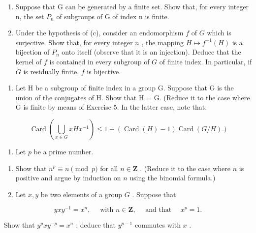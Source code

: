 \begin{enumerate}
\def\labelenumi{(\alph{enumi})}
\setcounter{enumi}{2}
\item
  Suppose that G can be generated by a finite set. Show that, for every integer n, the set \(P_{n}\) of subgroups of G of index n is finite.
\item
  Under the hypothesis of (c), consider an endomorphism \(f\) of \(G\) which is surjective. Show that, for every integer \(n\) , the mapping \(H \mapsto f^{-1}(H)\) is a bijection of \(P_n\) onto itself (observe that it is an injection). Deduce that the kernel of \(f\) is contained in every subgroup of \(G\) of finite index. In particular, if \(G\) is residually finite, \(f\) is bijective.
\end{enumerate}

\begin{enumerate}
\def\labelenumi{\arabic{enumi}.}
\setcounter{enumi}{5}
\tightlist
\item
  Let H be a subgroup of finite index in a group G. Suppose that G is the union of the conjugates of H. Show that H = G. (Reduce it to the case where G is finite by means of Exercise 5. In the latter case, note that:
\end{enumerate}

\[
\operatorname{Card} \left(\bigcup_ {x \in G} x H x ^ {- 1}\right) \leqslant 1 + (\operatorname{Card} (H) - 1) \operatorname{Card} (G / H).)
\]

\begin{enumerate}
\def\labelenumi{\arabic{enumi}.}
\setcounter{enumi}{6}
\tightlist
\item
  Let \(p\) be a prime number.
\end{enumerate}

\begin{enumerate}
\def\labelenumi{(\alph{enumi})}
\item
  Show that \(n^p \equiv n \pmod{p}\) for all \(n \in \mathbf{Z}\) . (Reduce it to the case where \(n\) is positive and argue by induction on \(n\) using the binomial formula.)
\item
  Let \(x, y\) be two elements of a group \(G\) . Suppose that
\end{enumerate}

\[
y x y ^ {- 1} = x ^ {n}, \quad \text { with } n \in \mathbf {Z}, \quad \text { and   that } \quad x ^ {p} = 1.
\]

Show that \(y^{p}xy^{-p} = x^{n}\) ; deduce that \(y^{p - 1}\) commutes with \(x\) .

